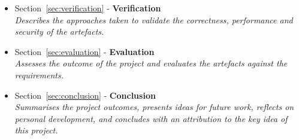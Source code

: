 \begin{itemize}
\clearpage %
	\item Section~\ref{sec:verification} - \textbf{Verification} \\ \textit{Describes the approaches taken to validate the correctness, performance and security of the artefacts.}
	\item Section~\ref{sec:evaluation} - \textbf{Evaluation} \\ \textit{Assesses the outcome of the project and evaluates the artefacts against the requirements.}
	\item Section~\ref{sec:conclusion} - \textbf{Conclusion} \\ \textit{Summarises the project outcomes, presents ideas for future work, reflects on personal development, and concludes with an attribution to the key idea of this project.}
\end{itemize}
